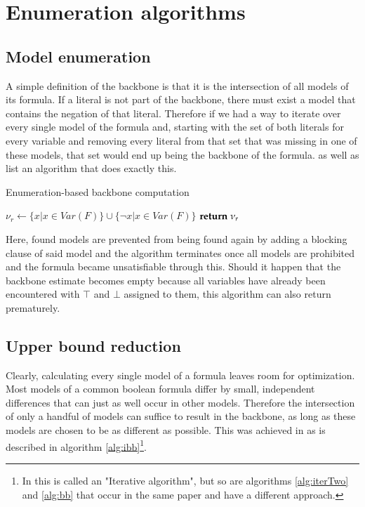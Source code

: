 \section{Enumeration algorithms}
\subsection{Model enumeration}
A simple definition of the backbone is that it is the intersection of all models of its formula. If a literal is not part of the backbone, there must exist a model that contains the negation of that literal. Therefore if we had a way to iterate over every single model of the formula and, starting with the set of both literals for every variable and removing every literal from that set that was missing in one of these models, that set would end up being the backbone of the formula. \cite{mjl10} as well as \cite{mjl15} list an algorithm that does exactly this. 

\begin{algorithm} %
\caption{{\sc Enumeration-based backbone computation}}
\DontPrintSemicolon
{}
$\nu_r \gets \{ x | x \in Var(F) \} \cup \{ \neg x | x \in Var(F) \}$\;
$\Return\; \nu_r$\;
\end{algorithm}

Here, found models are prevented from being found again by adding a blocking clause of said model and the algorithm terminates once all models are prohibited and the formula became unsatisfiable through this. Should it happen that the backbone estimate becomes empty because all variables have already been encountered with $\top$ and $\bot$ assigned to them, this algorithm can also return prematurely.

\subsection{Upper bound reduction}

Clearly, calculating every single model of a formula leaves room for optimization. Most models of a common boolean formula differ by small, independent differences that can just as well occur in other models. Therefore the intersection of only a handful of models can suffice to result in the backbone, as long as these models are chosen to be as different as possible. This was achieved in \cite{mjl15} as is described in algorithm \ref{alg:ibb}\footnote{In \cite{mjl15} this is called an "Iterative algorithm", but so are algorithms \ref{alg:iterTwo} and \ref{alg:bb} that occur in the same paper and have a different approach.}.

